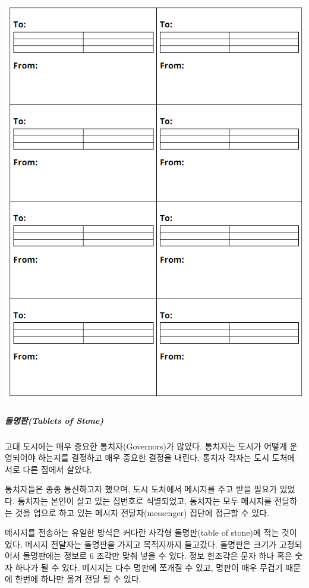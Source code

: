 \documentclass[]{article}
\begin{document}
\includegraphics{csunplugged/02-part/img/ch11-internet/11-internet-messages.png}

\subparagraph{돌명판(Tablets of Stone)}\label{tablets-of-stone-1}

고대 도시에는 매우 중요한 통치자(Governors)가 많았다. 통치자는 도시가
어떻게 운영되어야 하는지를 결정하고 매우 중요한 결정을 내린다. 통치자
각자는 도시 도처에 서로 다른 집에서 살았다.

통치자들은 종종 통신하고자 했으며, 도시 도처에서 메시지를 주고 받을
필요가 있었다. 통치자는 본인이 살고 있는 집번호로 식별되었고, 통치자는
모두 메시지를 전달하는 것을 업으로 하고 있는 메시지 전달자(messenger)
집단에 접근할 수 있다.

메시지를 전송하는 유일한 방식은 커다란 사각형 돌명판(table of stone)에
적는 것이었다. 메시지 전달자는 돌명판을 가지고 목적지까지 들고갔다.
돌명판은 크기가 고정되어서 돌명판에는 정보로 6 조각만 맞춰 넣을 수 있다.
정보 한조각은 문자 하나 혹은 숫자 하나가 될 수 있다. 메시지는 다수
명판에 쪼개질 수 있고, 명판이 매우 무겁기 때문에 한번에 하나만 옮겨 전달
될 수 있다.
\end{document}

